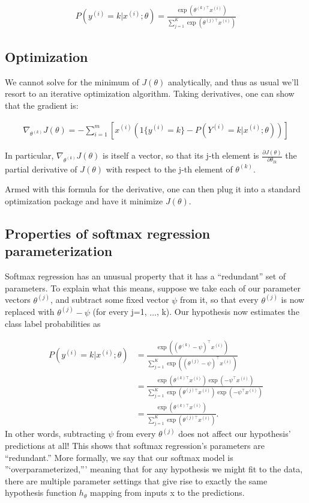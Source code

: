 \begin{align}
	P(y^{(i)} = k | x^{(i)} ; \theta) = \frac{\exp(\theta^{(k)\top} x^{(i)})}{\sum_{j=1}^K \exp(\theta^{(j)\top} x^{(i)}) }
\end{align}

\subsection{Optimization}

We cannot solve for the minimum of $J(\theta)$ analytically, and thus as usual we’ll resort to an iterative optimization algorithm. Taking derivatives, one can show that the gradient is:

\begin{align} \nabla_{\theta^{(k)}} J(\theta) = - \sum_{i=1}^{m}{ \left[ x^{(i)} \left( 1\{ y^{(i)} = k\} - P(Y^{(i)} = k | x^{(i)}; \theta) \right) \right] } \end{align}

In particular, $\nabla_{\theta^{(k)}} J(\theta)$ is itself a vector, so that its j-th element is $\frac{\partial J(\theta)}{\partial \theta_{lk}}$ the partial derivative of $J(\theta)$ with respect to the j-th element of $\theta^{(k)}$.

Armed with this formula for the derivative, one can then plug it into a standard optimization package and have it minimize $J(\theta)$.

\subsection{Properties of softmax regression parameterization}

Softmax regression has an unusual property that it has a “redundant” set of parameters. To explain what this means, suppose we take each of our parameter vectors $\theta^{(j)}$, and subtract some fixed vector $\psi$ from it, so that every $\theta^{(j)}$ is now replaced with $\theta^{(j)} - \psi$ (for every j=1, $\ldots$, k). Our hypothesis now estimates the class label probabilities as

\begin{align} 
P(y^{(i)} = k | x^{(i)} ; \theta) &= \frac{\exp((\theta^{(k)}-\psi)^\top x^{(i)})}{\sum_{j=1}^K \exp( (\theta^{(j)}-\psi)^\top x^{(i)})} \\ &= \frac{\exp(\theta^{(k)\top} x^{(i)}) \exp(-\psi^\top x^{(i)})}{\sum_{j=1}^K \exp(\theta^{(j)\top} x^{(i)}) \exp(-\psi^\top x^{(i)})} \\ &= \frac{\exp(\theta^{(k)\top} x^{(i)})}{\sum_{j=1}^K \exp(\theta^{(j)\top} x^{(i)})}. 
\end{align}
In other words, subtracting $\psi$ from every $\theta^{(j)}$ does not affect our hypothesis’ predictions at all! This shows that softmax regression’s parameters are “redundant.” More formally, we say that our softmax model is ”‘overparameterized,”’ meaning that for any hypothesis we might fit to the data, there are multiple parameter settings that give rise to exactly the same hypothesis function $h_\theta$ mapping from inputs x to the predictions.

